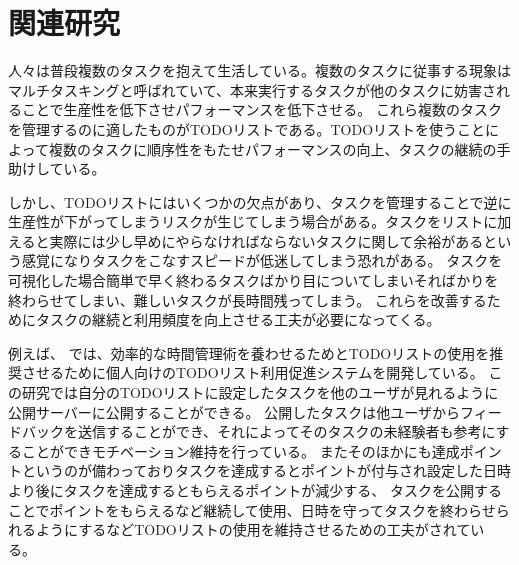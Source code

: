 \chapter{関連研究}
\label{cha:related}
人々は普段複数のタスクを抱えて生活している。複数のタスクに従事する現象はマルチタスキングと呼ばれていて、本来実行するタスクが他のタスクに妨害されることで生産性を低下させパフォーマンスを低下させる。
これら複数のタスクを管理するのに適したものがTODOリストである。TODOリストを使うことによって複数のタスクに順序性をもたせパフォーマンスの向上、タスクの継続の手助けしている。

しかし、TODOリストにはいくつかの欠点があり、タスクを管理することで逆に生産性が下がってしまうリスクが生じてしまう場合がある。タスクをリストに加えると実際には少し早めにやらなければならないタスクに関して余裕があるという感覚になりタスクをこなすスピードが低迷してしまう恐れがある。
タスクを可視化した場合簡単で早く終わるタスクばかり目についてしまいそればかりを終わらせてしまい、難しいタスクが長時間残ってしまう。
これらを改善するためにタスクの継続と利用頻度を向上させる工夫が必要になってくる。

例えば、\cite{report} では、効率的な時間管理術を養わせるためとTODOリストの使用を推奨させるために個人向けのTODOリスト利用促進システムを開発している。
この研究では自分のTODOリストに設定したタスクを他のユーザが見れるように公開サーバーに公開することができる。
公開したタスクは他ユーザからフィードバックを送信することができ、それによってそのタスクの未経験者も参考にすることができモチベーション維持を行っている。
またそのほかにも達成ポイントというのが備わっておりタスクを達成するとポイントが付与され設定した日時より後にタスクを達成するともらえるポイントが減少する、
タスクを公開することでポイントをもらえるなど継続して使用、日時を守ってタスクを終わらせられるようにするなどTODOリストの使用を維持させるための工夫がされている。


